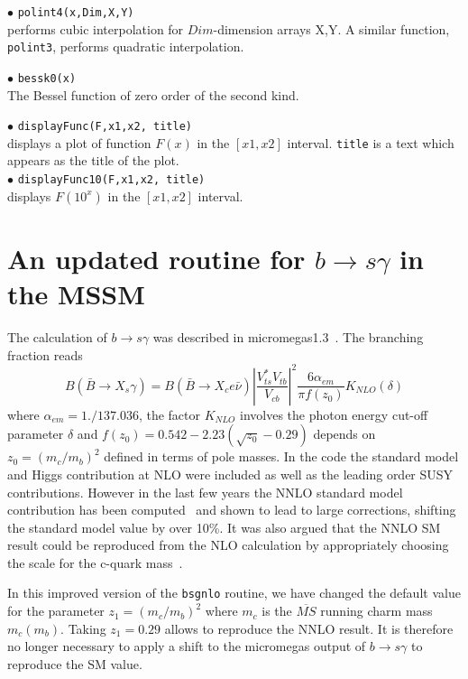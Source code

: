 \documentclass[12pt,a4paper]{article}
\begin{document}
\noindent$\bullet$ \verb|polint4(x,Dim,X,Y)|\\
performs   cubic interpolation for $Dim$-dimension arrays X,Y. A similar 
 function, \verb|polint3|, performs quadratic interpolation.

\noindent$\bullet$ \verb|bessk0(x)|\\ 
The Bessel function of zero  order of the second kind. 


\noindent$\bullet$ \verb|displayFunc(F,x1,x2, title)|\\
displays a plot of function $F(x)$ in the  $[x1,x2]$ interval. \verb|title| is a text 
which appears as the title of the plot. \\
\noindent$\bullet$ \verb|displayFunc10(F,x1,x2, title)|\\
displays $F(10^x)$ in the  $[x1,x2]$ interval. 



\appendix
\section{An updated routine for $b\rightarrow s\gamma$ in the MSSM}
The calculation of $b\rightarrow s\gamma$ was described in micromegas1.3~\cite{Belanger:2004yn}. 
The branching fraction reads
\begin{equation}
B(\bar{B}\rightarrow X_s \gamma) =B(\bar{B}\rightarrow X_c e\bar\nu) \left|\frac{V_{ts}^* V_{tb}}
{V_{cb}}\right|^2 \frac{6\alpha_{em}}{\pi f(z_0)} K_{NLO}(\delta)
\label{eq:bsg}
\end{equation}
where $\alpha_{em}=1./137.036$, the factor $K_{NLO}$ involves the photon energy cut-off parameter
$\delta$ and $f(z_0)=0.542-2.23(\sqrt{z_0} -0.29)$ depends on $z_0=(m_c/m_b)^2$ defined in terms of pole
masses.  
In the code 
the standard model and Higgs contribution at NLO were included as well as the leading order SUSY
contributions. However in the last few years
 the NNLO standard model contribution has been computed~\cite{Misiak:2006zs} and shown to lead to large corrections, shifting
 the standard model value by over 10\%. 
 It was also argued that the NNLO SM result could be reproduced from
 the NLO calculation by appropriately choosing the scale for the c-quark mass~\cite{Misiak:2006ab,Gambino:2008fj}. 



 In this improved version of the {\tt bsgnlo} routine, we 
 have changed the default value for the parameter $z_1=(m_c/m_b)^2$
 where $m_c$ is the $\overline{MS}$ running charm mass $m_c(m_b)$. Taking $z_1=0.29$ allows 
 to reproduce the NNLO result. 
 It is therefore no longer necessary to apply a shift to  the micromegas output of $b\rightarrow s\gamma$
 to reproduce the SM value. 
\end{document}
